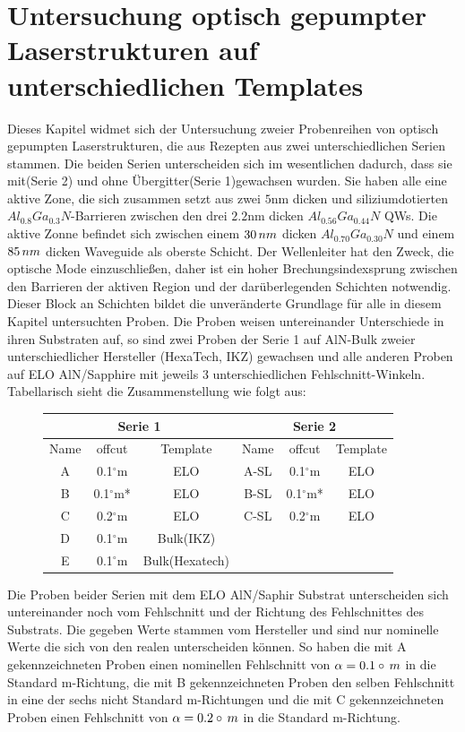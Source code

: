 \thispagestyle{fancy}
\justifying
\section{Untersuchung optisch gepumpter Laserstrukturen auf unterschiedlichen Templates}
Dieses Kapitel widmet sich der Untersuchung zweier Probenreihen von optisch gepumpten Laserstrukturen, die aus Rezepten aus zwei unterschiedlichen Serien stammen. Die beiden Serien unterscheiden sich im wesentlichen dadurch, dass sie mit(Serie 2) und ohne Übergitter(Serie 1)gewachsen wurden. Sie haben alle eine aktive Zone, die sich zusammen setzt aus zwei $5$nm dicken und siliziumdotierten $ Al_{0.8}Ga_{0.3}N$-Barrieren zwischen den drei $2.2$nm dicken $ Al_{0.56}Ga_{0.44}N$ QWs. Die aktive Zonne befindet sich zwischen einem $30 \thinspace nm$ dicken $ Al_{0.70}Ga_{0.30}N$ und einem $85 \thinspace nm$ dicken Waveguide als oberste Schicht. Der Wellenleiter hat den Zweck, die optische Mode einzuschließen, daher ist ein hoher Brechungsindexsprung zwischen den Barrieren der aktiven Region und der darüberlegenden Schichten notwendig.
Dieser Block an Schichten bildet die unveränderte Grundlage für alle in diesem Kapitel untersuchten Proben.
Die Proben weisen untereinander Unterschiede in ihren Substraten auf, so sind zwei Proben der Serie 1 auf AlN-Bulk zweier unterschiedlicher Hersteller (HexaTech, IKZ) gewachsen und alle anderen Proben auf ELO AlN/Sapphire mit jeweils 3 unterschiedlichen  Fehlschnitt-Winkeln. Tabellarisch sieht die Zusammenstellung wie folgt aus: 
\begin{figure}[H]
\centering
\begin{tabular}{ |c|c|c|c|c|c|   }
\hline
\multicolumn{3}{|c|}{Serie 1} & \multicolumn{3}{c|}{Serie 2}  \\
\hline
Name & offcut& Template & Name& offcut & Template \\
\hline
A & 0.1$^\circ$m & ELO & A-SL & 0.1$^\circ$m & ELO \\
B & 0.1$^\circ$m* & ELO & B-SL & 0.1$^\circ$m* & ELO \\
C & 0.2$^\circ$m & ELO & C-SL & 0.2$^\circ$m & ELO \\
D & 0.1$^\circ$m & Bulk(IKZ) &  & &  \\
E & 0.1$^\circ$m & Bulk(Hexatech) & & & \\
\hline
\end{tabular}
\end{figure}
\noindent 
Die Proben beider Serien mit dem ELO AlN/Saphir Substrat unterscheiden sich untereinander noch vom Fehlschnitt und der Richtung des Fehlschnittes des Substrats. Die gegeben Werte stammen vom Hersteller und sind nur nominelle Werte die sich von den realen unterscheiden können. So haben die mit A gekennzeichneten Proben einen nominellen Fehlschnitt von $\alpha = 0.1\circ \thinspace m$ in die Standard m-Richtung, die mit B gekennzeichneten Proben den selben Fehlschnitt in eine der sechs nicht Standard m-Richtungen und die mit C gekennzeichneten Proben einen Fehlschnitt von $\alpha = 0.2\circ \thinspace m$ in die Standard m-Richtung. 
